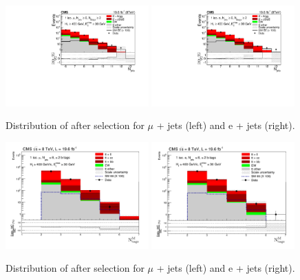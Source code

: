 \begin{figure}[ht!]
\centering
    \includegraphics[width=0.49\textwidth]{images/Run1/figures/NbOfSelectedJets_mu.pdf}
     \includegraphics[width=0.49\textwidth]{images/Run1/figures/NbOfSelectedJets_e.pdf}       
    \caption{Distribution of \njets after selection for $\mu$ + jets (left) and e + jets (right).}
    \label{fig:datasimnjets}
\end{figure}

\begin{figure}[ht!]
\centering
    \includegraphics[width=0.49\textwidth]{images/Run1/btagsmu.pdf}
     \includegraphics[width=0.49\textwidth]{images/Run1/btagse.pdf}        
    \caption{Distribution of \nMtags after selection for $\mu$ + jets (left) and e + jets (right).}
    \label{fig:datasimnMtags}
\end{figure}

